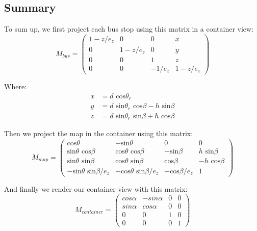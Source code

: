 \subsection{Summary}

To sum up, we first project each bus stop using this matrix in a container view:
\begin{equation}
M_{bus} = \left( \begin{array}{cccc}
	1-z / e_z				& 0 					& 0 						& x\\
	0 					& 1-z / e_z			& 0 						& y\\
	0					& 0					& 1						& z\\
	0					& 0					& -1/e_z					& 1-z / e_z
\end{array} \right)
\end{equation}

Where:
\begin{align} 
x	&= 	 d\textrm{ cos}\theta_r\\
y 	&= 	d\textrm{ sin}\theta_r\textrm{ cos}\beta - h\textrm{ sin}\beta\\
z 	&= 	d\textrm{ sin}\theta_r\textrm{ sin}\beta + h\textrm{ cos}\beta
\end{align}

Then we project the map in the container using this matrix:
\begin{equation}
M_{map} = \left( \begin{array}{cccc}
	\textrm{cos} \theta 						& -\textrm{sin} \theta 					& 0						& 0\\
	\textrm{sin} \theta \textrm{ cos} \beta 			& \textrm{cos} \theta \textrm{ cos} \beta		& -\textrm{sin} \beta			& h \textrm{ sin} \beta\\
	\textrm{sin} \theta \textrm{ sin} \beta			& \textrm{cos} \theta \textrm{ sin} \beta		& \textrm{cos} \beta			& -h \textrm{ cos} \beta\\
	-\textrm{sin} \theta \textrm{ sin} \beta / e_z		& -\textrm{cos} \theta \textrm{ sin} \beta/e_z	& -\textrm{cos} \beta/e_z		& 1
\end{array} \right)
\end{equation}

And finally we render our container view with this matrix:
\begin{equation}
M_{container} = \left( \begin{array}{cccc}
	cos \alpha				& -sin \alpha 			& 0 						& 0\\
	sin \alpha 				& cos \alpha			& 0 						& 0\\
	0					& 0					& 1						& 0\\
	0					& 0					& 0						& 1
\end{array} \right)
\end{equation}
